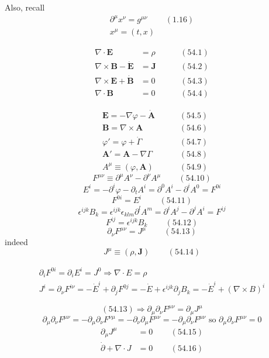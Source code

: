 \documentclass[twoside]{amsart}
\begin{document}
Also, recall 
\[
\begin{gathered}
  \partial^{\mu} x^{\nu} = g^{\mu \nu } \quad \quad \, (1.16) \\
  x^{\mu} = (t,x)
\end{gathered}
\]


\begin{align}
  \nabla \cdot \mathbf{E} & = \rho  \quad \quad \, & (54.1) \\ 
  \nabla \times \mathbf{B} - \dot{\mathbf{E}} & = \mathbf{J} \quad \quad \, & (54.2) \\ 
  \nabla \times \mathbf{E} + \dot{ \mathbf{ B} } & = 0 \quad \quad \, & (54.3) \\ 
  \nabla \cdot \mathbf{B} & = 0 \quad \quad \, & (54.4)
\end{align}

\[
\begin{aligned}
  & \mathbf{E} = - \nabla \varphi - \dot{ \mathbf{ A } }   \quad \quad \, & (54.5)\\ 
  & \mathbf{B} = \nabla \times \mathbf{ A }   \quad \quad \, & (54.6) \\ 
  & \varphi' = \varphi + \dot{ \Gamma } \quad \quad \, & (54.7) \\ 
 &  \mathbf{A}' = \mathbf{A} - \nabla \Gamma   \quad \quad \, & (54.8) \\ 
  & A^{\mu} \equiv ( \varphi , \mathbf{A} )  \quad \quad \,  & (54.9)
\end{aligned}
\]
\[
F^{\mu \nu } \equiv \partial^{\mu} A^{\nu} - \partial^{\nu} A^{\mu} \quad \quad \, (54.10)
\]
\[
E^i = - \partial^i \varphi - \partial_t A^i = \partial^0 A^i - \partial^i A^0 = F^{0i }
\]
\[
F^{ 0i} = E^i \quad \quad \, (54.11)
\]
\[
\epsilon^{ijk} B_k = \epsilon^{ijk} \epsilon_{klm} \partial^l A^m = \partial^i A^j - \partial^j A^i = F^{ij} 
\]
\[
F^{ij } = \epsilon^{ijk} B_k \quad \quad \, (54.12)
\]
\[
\partial_{\nu} F^{\mu \nu} = J^{\mu} \quad \quad \, (54.13)
\]
indeed 
\[
J^{\mu} \equiv ( \rho , \mathbf{J}) \quad \quad \, (54.14) 
\]

\[
\begin{gathered}
  \partial_i F^{0i} = \partial_i E^i = J^0 \Longrightarrow \nabla \cdot E = \rho \\ 
  J^i = \partial_{\nu} F^{i \nu} = - \dot{E}^i + \partial_j F^{0j} = -\dot{E} + \epsilon^{ijk} \partial_j B_k = -\dot{E}^i + (\nabla \times B)^i 
\end{gathered}
\]

\[
(54.13) \Longrightarrow \partial_{\mu} \partial_{\nu} F^{\mu \nu} = \partial_{\mu} J^{\mu}
\]
\[
\partial_{\mu} \partial_{\nu} F^{\mu \nu} = - \partial_{\mu} \partial_{\nu} F^{\nu \mu} = - \partial_{\nu } \partial_{\mu} F^{\mu \nu} = - \partial_{\mu } \partial_{\nu} F^{\mu \nu } \text{ so } \partial_{\mu} \partial_{\nu} F^{\mu \nu} = 0 
\]
\begin{align}
  \partial_{\mu} J^{\mu} & = 0 \quad \quad \, (54.15) \\ 
 \dot{\partial} + \nabla \cdot J & = 0 \quad \quad \, (54.16) 
\end{align}
\end{document}
